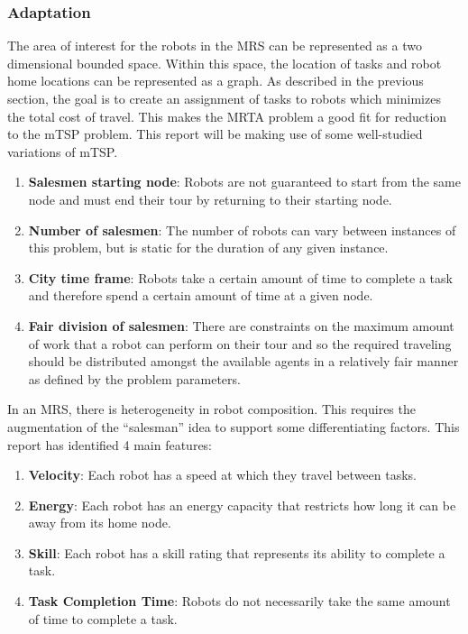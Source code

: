 \documentclass[a4paper]{article}
\begin{document}
\subsubsection{Adaptation}
The area of interest for the robots in the MRS can be represented as a two dimensional bounded space. Within this space, the location of tasks and robot home locations can be represented as a graph. As described in the previous section, the goal is to create an assignment of tasks to robots which minimizes the total cost of travel. This makes the MRTA problem a good fit for reduction to the mTSP problem. This report will be making use of some well-studied variations of mTSP.\cite{Badreldin}
\begin{enumerate}
\item \textbf{Salesmen starting node}: Robots are not guaranteed to start from the same node and must end their tour by returning to their starting node.
\item \textbf{Number of salesmen}: The number of robots can vary between instances of this problem, but is static for the duration of any given instance.
\item \textbf{City time frame}: Robots take a certain amount of time to complete a task and therefore spend a certain amount of time at a given node.
\item \textbf{Fair division of salesmen}: There are constraints on the maximum amount of work that a robot can perform on their tour and so the required traveling should be distributed amongst the available agents in a relatively fair manner as defined by the problem parameters.
\end{enumerate}

In an MRS, there is heterogeneity in robot composition. This requires the augmentation of the ``salesman'' idea to support some differentiating factors. This report has identified 4 main features:

\begin{enumerate}
\item \textbf{Velocity}: Each robot has a speed at which they travel between tasks.
\item \textbf{Energy}: Each robot has an energy capacity that restricts how long it can be away from its home node.
\item \textbf{Skill}: Each robot has a skill rating that represents its ability to complete a task.
\item \textbf{Task Completion Time}: Robots do not necessarily take the same amount of time to complete a task.

\end{enumerate}
\end{document}
